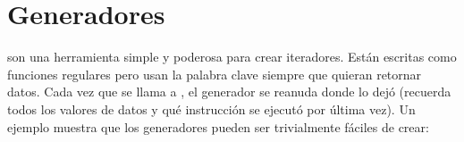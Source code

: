 \documentclass[a5paper,10pt,spanish]{sphinxmanual}
\begin{document}
\begin{sphinxVerbatim}[commandchars=\\\{\}]
  
   
    
\end{sphinxVerbatim}


\section{Generadores}
\label{\detokenize{tutorial/classes:generators}}\label{\detokenize{tutorial/classes:tut-generators}}
\sphinxAtStartPar
{\hyperref[\detokenize{glossary:term-generator}]{}} son una herramienta simple y poderosa para crear iteradores. Están escritas como funciones regulares pero usan la palabra clave  siempre que quieran retornar datos. Cada vez que se llama a , el generador se reanuda donde lo dejó (recuerda todos los valores de datos y qué instrucción se ejecutó por última vez). Un ejemplo muestra que los generadores pueden ser trivialmente fáciles de crear:

\begin{sphinxVerbatim}[commandchars=\\\{\}]
 
         
         \PYG{p}{[}\PYG{p}{]}
\end{sphinxVerbatim}

\begin{sphinxVerbatim}[commandchars=\\\{\}]
   
    
\end{sphinxVerbatim}
\end{document}
